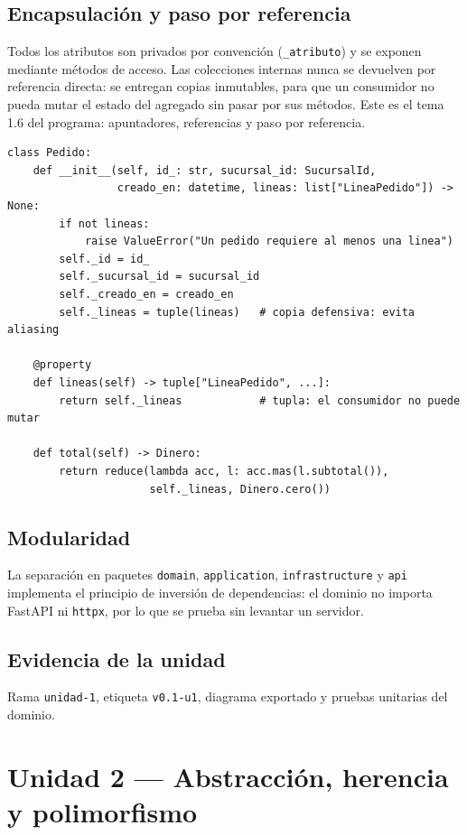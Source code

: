 \documentclass[11pt,letterpaper]{article}
\begin{document}
\subsection{Encapsulación y paso por referencia}
Todos los atributos son privados por convención (\texttt{\_atributo}) y se
exponen mediante métodos de acceso. Las colecciones internas nunca se devuelven
por referencia directa: se entregan copias inmutables, para que un consumidor no
pueda mutar el estado del agregado sin pasar por sus métodos. Este es el tema
1.6 del programa: apuntadores, referencias y paso por referencia.

\begin{lstlisting}[caption={Encapsulacion y copia defensiva.}]
class Pedido:
    def __init__(self, id_: str, sucursal_id: SucursalId,
                 creado_en: datetime, lineas: list["LineaPedido"]) -> None:
        if not lineas:
            raise ValueError("Un pedido requiere al menos una linea")
        self._id = id_
        self._sucursal_id = sucursal_id
        self._creado_en = creado_en
        self._lineas = tuple(lineas)   # copia defensiva: evita aliasing

    @property
    def lineas(self) -> tuple["LineaPedido", ...]:
        return self._lineas            # tupla: el consumidor no puede mutar

    def total(self) -> Dinero:
        return reduce(lambda acc, l: acc.mas(l.subtotal()),
                      self._lineas, Dinero.cero())
\end{lstlisting}

\subsection{Modularidad}
La separación en paquetes \texttt{domain}, \texttt{application},
\texttt{infrastructure} y \texttt{api} implementa el principio de inversión de
dependencias: el dominio no importa FastAPI ni \texttt{httpx}, por lo que se
prueba sin levantar un servidor.

\subsection{Evidencia de la unidad}
Rama \texttt{unidad-1}, etiqueta \texttt{v0.1-u1}, diagrama exportado y pruebas
unitarias del dominio.

\newpage
\section{Unidad 2 --- Abstracción, herencia y polimorfismo}
\end{document}
